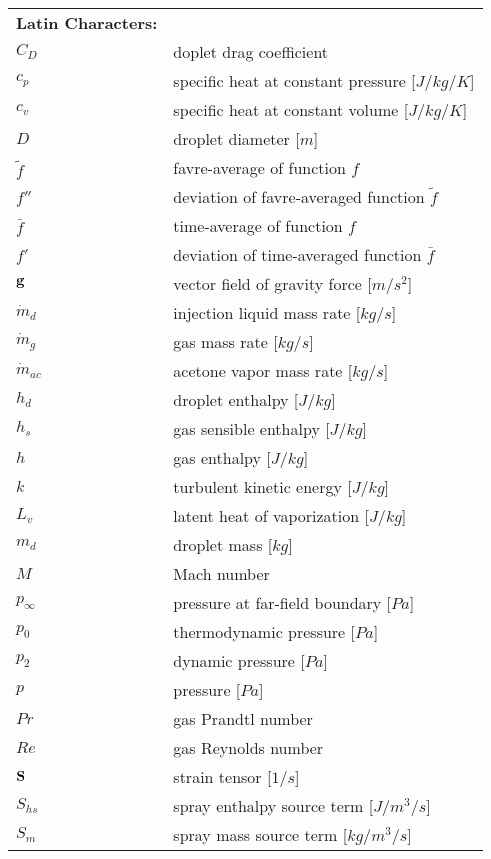 
\begin{longtable}{ll}
\textbf{Latin Characters:} & \\
$C_D$ & doplet drag coefficient \\
$c_p$ & specific heat at constant pressure [$J/kg/K$] \\
$c_v$ & specific heat at constant volume [$J/kg/K$]\\
$D$ & droplet diameter [$m$]\\
$\tilde{f}$ & favre-average of function $f$\\
$f''$ & deviation of favre-averaged function $\tilde{f}$\\
$\bar{f}$ & time-average of function $f$\\
$f'$ & deviation of time-averaged function $\bar{f}$\\
$\mathbf{g}$ & vector field of gravity force [$m/s^2$]\\
$\dot{m}_d$ & injection liquid mass rate [$kg/s$]\\
$\dot{m}_{g}$ & gas mass rate [$kg/s$]\\
$\dot{m}_{ac}$ & acetone vapor mass rate [$kg/s$]\\
$h_d$ & droplet enthalpy [$J/kg$]\\
$h_s$ & gas sensible enthalpy [$J/kg$]\\
$h$ & gas enthalpy [$J/kg$]\\
$k$ & turbulent kinetic energy [$J/kg$]\\
$L_v$ & latent heat of vaporization [$J/kg$]\\
$m_d$ & droplet mass [$kg$]\\
$M$ & Mach number \\
$p_{\infty}$ & pressure at far-field boundary [$Pa$]\\
$p_{0}$ & thermodynamic pressure [$Pa$]\\
$p_{2}$ & dynamic pressure [$Pa$]\\
$p$ & pressure [$Pa$]\\
$Pr$ & gas Prandtl number \\
$Re$ & gas Reynolds number \\
$\mathbf{S}$ & strain tensor [$1/s$]\\
$S_{hs}$ & spray enthalpy source term [$J/m^3/s$]\\
$S_{m}$ & spray mass source term [$kg/m^3/s$]\\

\end{longtable}

